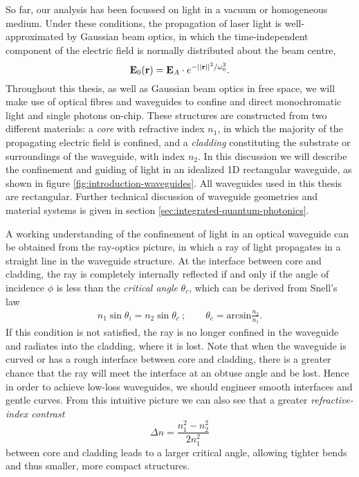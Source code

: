 So far, our analysis has been focussed on light in a vacuum or homogeneous medium. Under these conditions, the propagation of laser light is well-approximated by Gaussian beam optics, in which the time-independent component of the electric field is normally distributed about the beam centre,
\begin{equation}
    \mathbf{E}_0(\mathbf{r}) = \mathbf{E}_{A}\cdot e^{-||\mathbf{r}||^2/\omega_0^2}.
\end{equation}
Throughout this thesis, as well as Gaussian beam optics in free space, we will make use of optical fibres and waveguides to confine and direct monochromatic light and single photons on-chip. These structures are constructed from two different materials: a \emph{core} with refractive index $n_1$, in which the majority of the propagating electric field is confined, and a \emph{cladding} constituting the substrate or surroundings of the waveguide, with index $n_2$. 
In this discussion we will describe the confinement and guiding of light in an idealized 1D rectangular waveguide, as shown in figure \ref{fig:introduction-waveguides}. All waveguides used in this thesis are rectangular. Further technical discussion of waveguide geometries and material systems is given in section \ref{sec:integrated-quantum-photonics}.

A working understanding of the confinement of light in an optical waveguide can be obtained from the ray-optics picture, in which a ray of light propagates in a straight line in the waveguide structure. At the interface between core and cladding, the ray is completely internally reflected if and only if the angle of incidence $\phi$ is less than the \emph{critical angle} $\theta_c$, which can be derived from Snell's law
\begin{gather}
   n_1 \sin \theta_i  = n_2 \sin \theta_c ~; \qquad
   \theta_c = \mathrm{arcsin} \frac{n_2}{n_1}.
\end{gather}
If this condition is not satisfied, the ray is no longer confined in the waveguide and radiates into the cladding, where it is lost.
Note that when the waveguide is curved or has a rough interface between core and cladding, there is a greater chance that the ray will meet the interface at an obtuse angle and be lost. Hence in order to achieve low-loss waveguides, we should engineer smooth interfaces and gentle curves. From this intuitive picture we can also see that a greater \emph{refractive-index contrast} 
\begin{equation}
    \Delta n = \frac{n_1^2-n_2^2}{2n_1^2}
\end{equation}
between core and cladding leads to a larger critical angle, allowing tighter bends and thus smaller, more compact structures.

